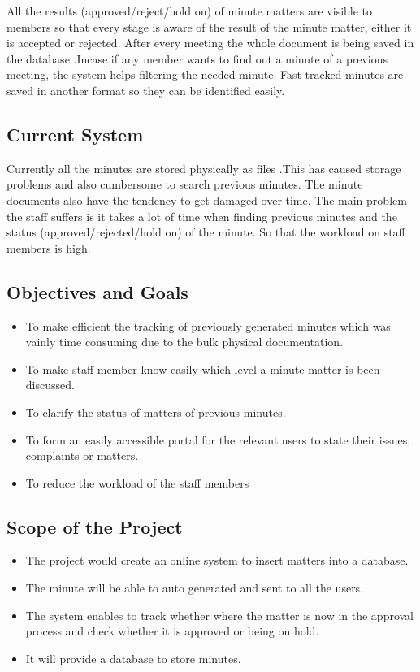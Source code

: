 \documentclass[a4paper,beamer]{article}
\begin{document}
	All the results (approved/reject/hold on) of minute matters are visible to members so that every stage is aware of the result of the minute matter, either it is accepted or rejected. After every meeting the whole document is being saved in the database .Incase if any member wants to find  out a minute of a previous meeting, the system helps filtering the needed minute.
	Fast tracked minutes are saved in another format so  they can be identified easily.\newline
	
	\subsection{Current System}
	Currently all the minutes are stored physically as files .This has caused  storage problems and also cumbersome to search previous minutes. The minute documents also have the  tendency to get damaged over time. The main problem the staff suffers is it takes a lot of time when finding previous minutes and the status (approved/rejected/hold on) of the minute. So that the workload on staff members is high.
	
	\subsection{Objectives and Goals}
	\begin{itemize}
		\item To make efficient the tracking of previously generated minutes which was vainly time consuming due to the bulk physical documentation.
		\item To make staff member know easily  which level a minute matter is been discussed.
		\item To clarify the status of matters of previous minutes.
		\item To form an easily accessible portal for the relevant users to state their issues, complaints or matters.
		\item To reduce the workload of the staff members 
	\end{itemize}
	
	\subsection{Scope of the Project}
	\begin{itemize}
		\item The project would create an online system to insert matters into a database.
		\item The minute will be able to auto generated and sent to all the users.
		\item The system enables to track whether where the matter is now in the approval process and check whether it is approved or being on hold.
		\item It will provide a database to store minutes.
	\end{itemize}
	
\end{document}
